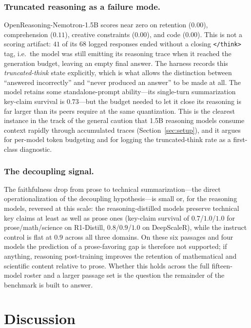 \documentclass[runningheads]{llncs}
\begin{document}
\subsubsection{Truncated reasoning as a failure mode.}
OpenReasoning-Nemotron-1.5B scores near zero on retention ($0.00$),
comprehension ($0.11$), creative constraints ($0.00$), and code ($0.00$). This is
not a scoring artifact: $41$ of its $68$ logged responses ended without a closing
\texttt{</think>} tag, i.e.\ the model was still emitting its reasoning trace when
it reached the generation budget, leaving an empty final answer. The harness
records this \emph{truncated-think} state explicitly, which is what allows the
distinction between ``answered incorrectly'' and ``never produced an answer'' to
be made at all. The model retains some standalone-prompt ability---its
single-turn summarization key-claim survival is $0.73$---but the budget needed to
let it close its reasoning is far larger than its peers require at the same
quantization. This is the clearest instance in the track of the general caution
that 1.5B reasoning models consume context rapidly through accumulated traces
(Section~\ref{sec:setup}), and it argues for per-model token budgeting and for
logging the truncated-think rate as a first-class diagnostic.

\subsubsection{The decoupling signal.}
The faithfulness drop from prose to technical summarization---the direct
operationalization of the decoupling hypothesis---is small or, for the reasoning
models, reversed at this scale: the reasoning-distilled models preserve technical
key claims at least as well as prose ones (key-claim survival of
$0.7$/$1.0$/$1.0$ for prose/math/science on R1-Distill, $0.8$/$0.9$/$1.0$ on
DeepScaleR), while the instruct control is flat at $0.9$ across all three
domains. On these six passages and four models the prediction of a prose-favoring
gap is therefore not supported; if anything, reasoning post-training improves the
retention of mathematical and scientific content relative to prose. Whether this
holds across the full fifteen-model roster and a larger passage set is the
question the remainder of the benchmark is built to answer.

\section{Discussion}
\label{sec:discussion}
\end{document}
